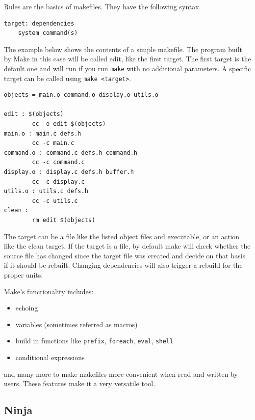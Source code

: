 Rules are the basics of makefiles. They have the following syntax.

\begin{verbatim}
target: dependencies
    system command(s)
\end{verbatim}

The example below shows the contents of a simple makefile. The program
built by Make in this case will be called edit, like the first target.
The first target is the default one and will run if you run
\texttt{make} with no additional parameters. A specific target can be
called using \texttt{make\ \textless{}target\textgreater{}}.

\begin{lstlisting}[frame=single, caption={%
  Example of simple MakeFile \cite{MAKEFILE}%
}]
objects = main.o command.o display.o utils.o

edit : $(objects)
        cc -o edit $(objects)
main.o : main.c defs.h
        cc -c main.c
command.o : command.c defs.h command.h
        cc -c command.c
display.o : display.c defs.h buffer.h
        cc -c display.c
utils.o : utils.c defs.h
        cc -c utils.c
clean :
        rm edit $(objects)
\end{lstlisting}

The target can be a file like the listed object files and executable, or
an action like the clean target. If the target is a file, by default
make will check whether the source file has changed since the target
file was created and decide on that basis if it should be rebuilt.
Changing dependencies will also trigger a rebuild for the proper units.

Make's functionality includes:

\begin{itemize}
\item
  echoing
\item
  variables (sometimes referred as macros)
\item
  build in functions like \texttt{prefix}, \texttt{foreach},
  \texttt{eval}, \texttt{shell}
\item
  conditional expressions
\end{itemize}

and many more to make makefiles more convenient when read and written by
users. These features make it a very versatile tool.

\hypertarget{ninja}{%
\subsection{Ninja}\label{ninja}}

